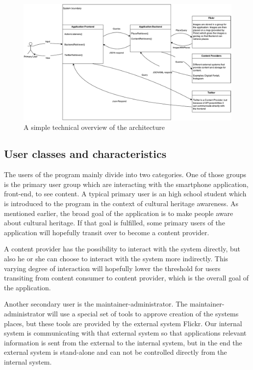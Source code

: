 \begin{figure}[h!]
\begin{center}
\includegraphics[scale=0.6]{tooverview-architecture}
\caption{A simple technical overview of the architecture}
\end{center}
\end{figure}

\subsection{User classes and characteristics}
The users of the program mainly divide into two categories. One of those groups is the primary user group which are interacting with the smartphone application, front-end, to see content. A typical primary user is an high school student which is introduced to the program in the context of cultural heritage awareness. As mentioned earlier, the broad goal of the application is to make people aware about cultural heritage. If that goal is fulfilled, some primary users of the application will hopefully transit over to become a content provider. 

\noindent

A content provider has the possibility to interact with the system directly, but also he or she can choose to interact with the system more indirectly. This varying degree of interaction will hopefully lower the threshold for users transiting from content consumer to content provider, which is the overall goal of the application. 

\noindent

Another secondary user is the maintainer-administrator. The maintainer-administrator will use a special set of tools to approve creation of the systems places, but these tools are provided by the external system Flickr. Our internal system is communicating with that external system so that applications relevant information is sent from the external to the internal system, but in the end the external system is stand-alone and can not be controlled directly from the internal system. 

